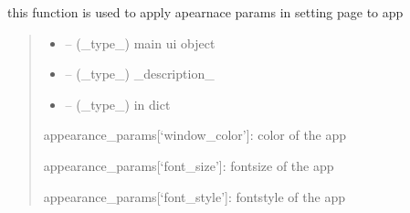 \documentclass[letterpaper,10pt,english]{sphinxmanual}
\begin{document}
\begin{savenotes}\begin{fulllineitems}
\label{\detokenize{setting/backend/mainsetting_funcs:oxin.backend.mainsetting_funcs.apply_appearance_params_to_program}}
\pysigstartsignatures
{}
\pysigstopsignatures
\sphinxAtStartPar
this function is used to apply apearnace params in setting page to app
\begin{quote}\begin{description}
\begin{itemize}
\item {} 
\sphinxAtStartPar
{} – (\_type\_) main ui object

\item {} 
\sphinxAtStartPar
{} – (\_type\_) \_description\_

\item {} 
\sphinxAtStartPar
{} – (\_type\_) in dict

\end{itemize}

\sphinxAtStartPar
appearance\_params{[}‘window\_color’{]}: color of the app

\sphinxAtStartPar
appearance\_params{[}‘font\_size’{]}: font\sphinxhyphen{}size of the app

\sphinxAtStartPar
appearance\_params{[}‘font\_style’{]}: font\sphinxhyphen{}style of the app

\end{description}\end{quote}

\end{fulllineitems}\end{savenotes}

\end{document}
